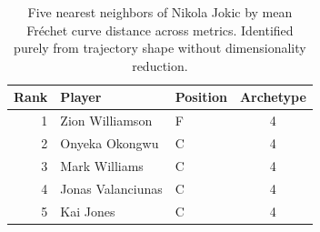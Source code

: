 \begin{table}[htbp]
  \centering\small
  \begin{tabular}{rllc}
    \toprule
    Rank & Player & Position & Archetype \\
    \midrule
    1 & Zion Williamson & F & 4 \\
    2 & Onyeka Okongwu & C & 4 \\
    3 & Mark Williams & C & 4 \\
    4 & Jonas Valanciunas & C & 4 \\
    5 & Kai Jones & C & 4 \\
    \bottomrule
  \end{tabular}
  \caption{Five nearest neighbors of Nikola Jokic by mean Fr\'{e}chet curve distance across metrics. Identified purely from trajectory shape without dimensionality reduction.}
  \label{tab:Nikola_Jokic_frechet_curve_neighbors}
\end{table}

